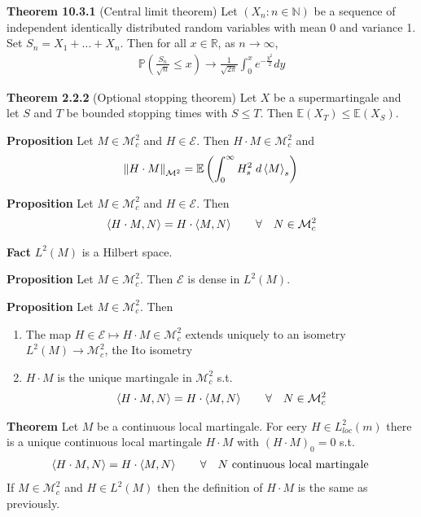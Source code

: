 \documentclass[hidelinks, 12pt]{article}
\theoremstyle{mydefstyle}
\theoremstyle{mythmstyle}
\begin{document}
\textbf{Theorem 10.3.1} (Central limit theorem) Let $(X_n : n \in \mathbb{N})$ be a sequence of independent identically distributed random variables with mean 0 and variance 1. Set $S_n = X_1 + \dots + X_n$. Then for all $x \in \mathbb{R}$, as $n \to \infty$,
\begin{gather*}
\mathbb{P} \left( \frac{S_n}{\sqrt{n}} \le x \right) \to \frac{1}{\sqrt{2\pi}} \int_0^x e^{-\frac{y^2}{2}} dy
\end{gather*}

\textbf{Theorem 2.2.2} (Optional stopping theorem) Let $X$ be a supermartingale and let $S$ and $T$ be bounded stopping times with $S \le T$. Then $\mathbb{E}(X_T) \le \mathbb{E}(X_S)$. 

\textbf{Proposition} Let $M \in \mathcal{M}^2_c$ and $H \in \mathcal{E}$. Then $H \cdot M \in \mathcal{M}^2_c$ and 
\begin{gather*}
\norm{H \cdot M}_{\mathcal{M}^2} = \mathbb{E} \left( \int_0^{\infty} H_s^2 \hspace{1mm} d\braket{M}_s \right)
\end{gather*}

\textbf{Proposition} Let $M \in \mathcal{M}^2_c$ and $H \in \mathcal{E}$. Then
\begin{gather*}
\braket{H \cdot M, N} = H \cdot \braket{M, N} \qquad \forall \quad N \in \mathcal{M}^2_c
\end{gather*}

\textbf{Fact} $L^2(M)$ is a Hilbert space.

\textbf{Proposition} Let $M \in \mathcal{M}^2_c$. Then $\mathcal{E}$ is dense in $L^2(M)$.

\textbf{Proposition} Let $M \in \mathcal{M}^2_c$. Then
\begin{enumerate}[label = (\roman*)]
\item The map $H \in \mathcal{E} \mapsto H \cdot M \in \mathcal{M}^2_c$ extends uniquely to an isometry $L^2(M) \to \mathcal{M}^2_c$, the Ito isometry
\item $H \cdot M$ is the unique martingale in $\mathcal{M}^2_c$ s.t.
\begin{gather*}
\braket{H \cdot M, N} = H \cdot \braket{M, N} \qquad \forall \quad N \in \mathcal{M}^2_c
\end{gather*}
\end{enumerate}

\textbf{Theorem} Let $M$ be a continuous local martingale. For eery $H \in L^2_{loc}(m)$ there is a unique continuous local martingale $H \cdot M$ with $(H \cdot M)_0 = 0$ s.t.
\begin{gather*}
\braket{H \cdot M, N} = H \cdot \braket{M, N} \qquad \forall \quad N \mbox{ continuous local martingale }
\end{gather*}
If $M \in \mathcal{M}^2_c$ and $H \in L^2(M)$ then the definition of $H \cdot M$ is the same as previously.
\end{document}
